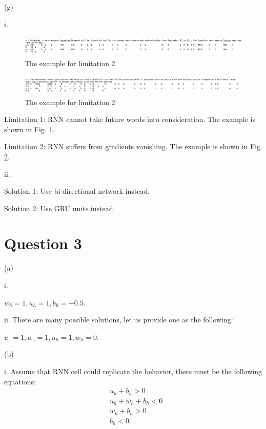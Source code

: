 \documentclass{article}
\theoremstyle{definition}
\theoremstyle{remark}
\numberwithin{equation}{section}
\begin{document}
 \newpage
 (g) 
 
 i. 
 
  \begin{figure}[H] 
  \centering
 \includegraphics[width=120mm, height=10mm]{fig/eg3.png}
   \caption{The example for limitation 2}
   \label{fig: eg3}
 \end{figure}
 
  \begin{figure}[H] 
  \centering
 \includegraphics[width=120mm, height=10mm]{fig/eg4.png}
   \caption{The example for limitation 2}
   \label{fig: eg4}
 \end{figure}
 
 
 Limitation 1: RNN cannot take future words into consideration. The example is shown in Fig. \ref{fig: eg3}.
 
 Limitation 2: RNN suffers from gradients vanishing. The example is shown in Fig. \ref{fig: eg4}.
 
 ii.
 
 Solution 1: Use bi-directional network instead.
 
 Solution 2: Use GRU units instead.
 
 
 \newpage
 
 \section{Question 3}
 
 (a) 
 
 i.
 
$w_h = 1, u_h = 1, b_h = -0.5$.

ii. There are many possible solutions, let us provide one as the following:

$u_z = 1, w_z = 1, u_h = 1, w_h = 0$.

\newpage

(b) 

i. Assume that RNN cell could replicate the behavior, there must be the following equations:
\begin{align*}
&u_h  + b_h > 0 \\
&u_h + w_h + b_h < 0 \\
&w_h + b_h > 0 \\
&b_h < 0.
\end{align*}
\end{document}
